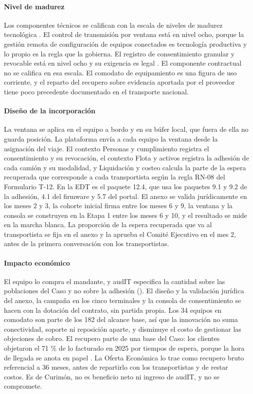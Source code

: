 \paragraph{Nivel de madurez} Los componentes técnicos se califican con la escala de niveles de madurez
tecnológica \parencite{iso16290}. El control de transmisión por ventana está en nivel ocho, porque la
gestión remota de configuración de equipos conectados es tecnología productiva y lo propio es la regla
que la gobierna. El registro de consentimiento granular y revocable está en nivel ocho y su exigencia es
legal \parencite{ley21719}. El componente contractual no se califica en esa escala. El comodato de
equipamiento es una figura de uso corriente, y el reparto del recupero sobre evidencia aportada por el
proveedor tiene poco precedente documentado en el transporte nacional.

\paragraph{Diseño de la incorporación} La ventana se aplica en el equipo a bordo y en su búfer local, que
fuera de ella no guarda posición. La plataforma envía a cada equipo la ventana desde la asignación del
viaje. El contexto Personas y cumplimiento registra el consentimiento y su revocación, el contexto Flota
y activos registra la adhesión de cada camión y su modalidad, y Liquidación y costeo calcula la parte
de la espera recuperada que corresponde a cada transportista según la regla RN-08 del Formulario T-12.
En la EDT es el paquete 12.4, que usa los paquetes 9.1 y 9.2 de la adhesión, 4.1 del firmware y 5.7 del
portal. El anexo se valida jurídicamente en los meses 2 y 3, la cohorte inicial firma entre los meses 6
y 9, la ventana y la consola se construyen en la Etapa 1 entre los meses 6 y 10, y el resultado se mide
en la marcha blanca. La proporción de la espera recuperada que va al transportista se fija en el anexo y
la aprueba el Comité Ejecutivo en el mes 2, antes de la primera conversación con los transportistas.

\paragraph{Impacto económico} El equipo lo compra el mandante, y audIT especifica la cantidad sobre las
poblaciones del Caso y no sobre la adhesión (). El diseño y la validación
jurídica del anexo, la campaña en los cinco terminales y la consola de consentimiento se hacen con la
dotación del contrato, sin partida propia. Los 34 equipos en comodato son parte de los 182 del alcance
base, así que la innovación no suma conectividad, soporte ni reposición aparte, y disminuye el costo de
gestionar las objeciones de cobro. El recupero parte de una base del Caso: los clientes objetaron el 71 \% de lo
facturado en 2025 por tiempos de espera, porque la hora de llegada se anota en papel . La Oferta Económica lo trae como recupero bruto referencial a 36 meses, antes de repartirlo
con los transportistas y de restar costos. Es de Curimón, no es beneficio neto ni ingreso de audIT, y
no se compromete.


